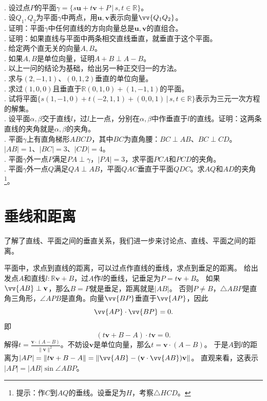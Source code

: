 \documentclass[12pt,UTF8,fontset=none]{ctexbook}
\begin{document}
\begin{xt}
    \mbox{} \\ 
    . 设过点$P$的平面$\gamma = \{s\mathbf{u} + t\mathbf{v} + P \, | \, s,t\in\mathbb{R}\}$。\\
    . 设$Q_1,Q_2$为平面$\gamma$中两点，用$\mathbf{u},\mathbf{v}$表示向量$\vv{Q_1Q_2}$。\\
    . 证明：平面$\gamma$中任何直线的方向向量总是$\mathbf{u},\mathbf{v}$的直组合。\\
    . 证明：如果直线与平面中两条相交直线垂直，就垂直于这个平面。\\     
    . 给定两个直无关的向量$A,B$。\\
    . 如果$A,B$是单位向量，证明$A+B \perp A-B$。\\
    . 以上一问的结论为基础，给出另一种正交归一的方法。\\
    . 求与$(2,-1,1)$、$(0,1,2)$垂直的单位向量。\\
    . 求过$(1,0,0)$且垂直于$\mathbb{R}(0,1,0)+(1,-1,1)$的平面。\\
    . 试将平面$\{s(1,-1,0) + t(-2,1,1) + (0,0,1) \, | \, s,t\in\mathbb{R}\}$表示为三元一次方程的解集。\\
    . 设平面$\alpha, \beta$交于直线$l$，过$l$上一点，分别在$\alpha, \beta$中作垂直于$l$的直线。证明：这两条直线的夹角就是$\alpha, \beta$的夹角。\\
    . 平面$\gamma$上有直角梯形$ABCD$，其中$BC$为直角腰：$BC\perp AB$、$BC\perp CD$。$|AB| = 1$、$|BC| = 3$、$|CD| = 4$。\\
    . 平面$\gamma$外一点$P$满足$PA \perp \gamma$，$|PA| = 3$，求平面$PCA$和$PCD$的夹角。\\
    . 平面$\gamma$外一点$Q$满足$QA \perp AB$，平面$QAC$垂直于平面$QDC$。求$AQ$和$AD$的夹角\footnote{提示：作$C$到$AQ$的垂线。设垂足为$H$，考察$\triangle HCD$。}。
\end{xt}


\section{垂线和距离}
了解了直线、平面之间的垂直关系，我们进一步来讨论点、直线、平面之间的距离。

平面中，求点到直线的距离，可以过点作直线的垂线，求点到垂足的距离。
给出发点$A$和直线$l : \mathbb{R}\mathbf{v} + B$，过$A$作$l$的垂线，记垂足为$P = t\mathbf{v} + B$。
如果$\vv{AB}\perp\mathbf{v}$，那么$B=P$就是垂足，距离就是$|AB|$。
否则$P\neq B$，$\triangle ABP$是直角三角形，$\angle APB$是直角。向量$\vv{BP}$垂直于$\vv{AP}$，因此
$$ \vv{AP}\cdot \vv{BP} = 0.$$
即
$$ (t\mathbf{v} + B - A)\cdot t\mathbf{v} = 0.$$
解得$t = \frac{\mathbf{v}\cdot(A-B)}{\|\mathbf{v}\|^2}$。不妨设$\mathbf{v}$是单位向量，那么$t=\mathbf{v}\cdot(A-B)$。
于是$A$到$l$的距离为$|AP| = \| t\mathbf{v} + B - A\| = \| \vv{AB} - (\mathbf{v}\cdot \vv{AB})\mathbf{v}\|$。
直观来看，这表示$|AP| = |AB|\sin{\angle ABP}$。
\end{document}
